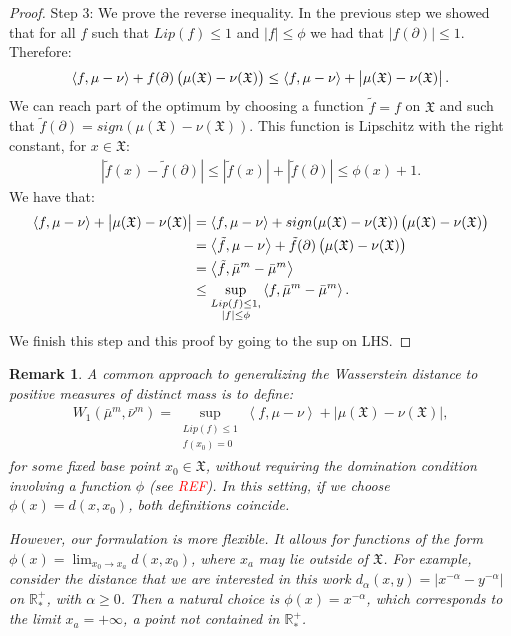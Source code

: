 \documentclass[11pt,a4paper]{article}
\newcommand{\RRP}{\mathbb{R}^+_*}
\newcommand{\XF}{\mathfrak{X}}
\newcommand{\brac}[1]{\left\langle#1\right\rangle}
\newtheorem{remark}[theorem]{Remark}
\begin{document}
\begin{proof}
    Step $3$: We prove the reverse inequality. In the previous step we showed that for all $f$ such that $Lip(f) \leq 1$ and $|f| \leq \phi$ we had that $|f(\partial)| \leq 1$. Therefore:
    \begin{align*}
        \brac{f,\mu - \nu} + f(\partial) \left(\mu(\XF) - \nu(\XF)\vphantom{A^2}\right) \leq \brac{f,\mu - \nu} + \left|\mu(\XF) - \nu(\XF)\vphantom{A^2}\right|.
    \end{align*}
    We can reach part of the optimum by choosing a function $\tilde{f} = f$ on $\XF$ and such that $\tilde{f}(\partial) = sign(\mu(\XF) - \nu(\XF))$. This function is Lipschitz with the right constant, for $x \in \XF$:
    \begin{align*}
        \left|\tilde{f}(x) - \tilde{f}(\partial)\right| \leq  \left|\tilde{f}(x)\right| + \left|\tilde{f}(\partial)\right| \leq \phi(x) + 1.
    \end{align*}
    We have that:
    \begin{align*}
        \brac{f,\mu - \nu} + \left|\vphantom{A^2}\mu(\XF) - \nu(\XF) \right| &= \brac{f,\mu - \nu} + sign(\mu(\XF) - \nu(\XF))\left(\vphantom{A^2}\mu(\XF) - \nu(\XF) \right)\\
        &=  \brac{\tilde{f},\mu - \nu} + \tilde{f}(\partial)\left(\vphantom{A^2}\mu(\XF) - \nu(\XF) \right)\\
        &= \brac{\tilde{f},\bar{\mu}^m - \bar{\mu}^m} \\
        &\leq \sup\limits_{\substack{Lip(f) \leq 1,\\ |f| \leq \phi}} \brac{f,\bar{\mu}^m - \bar{\mu}^m} .
    \end{align*}
    We finish this step and this proof by going to the sup on LHS.
\end{proof}
\begin{remark}
A common approach to generalizing the Wasserstein distance to positive measures of distinct mass is to define:
\begin{align*}
    W_1(\bar{\mu}^m, \bar{\nu}^m) = \sup_{\substack{Lip(f) \leq 1\\ f(x_0) = 0}} \brac{f, \mu - \nu} + \left| \mu(\XF) - \nu(\XF) \right|,
\end{align*}
for some fixed base point $x_0 \in \XF$, without requiring the domination condition involving a function $\phi$ (see \textcolor{red}{REF}). In this setting, if we choose $\phi(x) = d(x, x_0)$, both definitions coincide.

However, our formulation is more flexible. It allows for functions of the form $\phi(x) = \lim_{x_0 \to x_a} d(x, x_0)$, where $x_a$ may lie outside of $\XF$. For example, consider the distance that we are interested in this work \(d_\alpha(x, y) = |x^{-\alpha} - y^{-\alpha}|\) on \(\RRP\), with \(\alpha \geq 0\). Then a natural choice is \(\phi(x) = x^{-\alpha}\), which corresponds to the limit \(x_a = +\infty\), a point not contained in \(\RRP\).
\end{remark}
\end{document}
